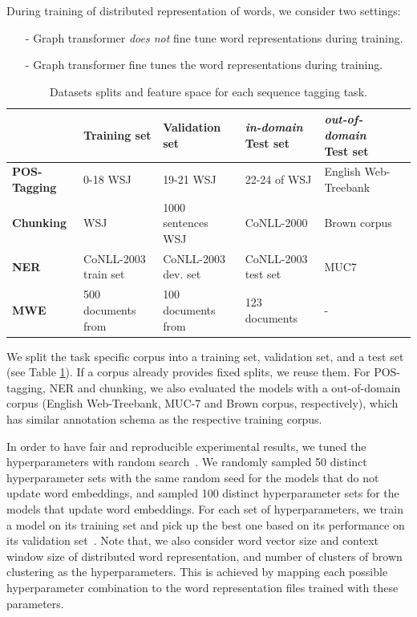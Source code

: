 During training of distributed representation of words, we consider two settings: 

\begin{small}
\begin{itemize}
\item[-] Graph transformer \textit{does not} fine tune word representations during training. 
\item[-] Graph transformer fine tunes the word representations during training. 
\end{itemize}
\end{small}

\begin{table}
\caption{Datasets splits and feature space for each sequence tagging task.}
\begin{small}
\begin{tabular}{lllp{}ll}
\hline
			& \textbf{Training set} & \textbf{Validation set} & \textbf{\textit{in-domain} Test set} & \textbf{\textit{out-of-domain} Test set} \\ \hline
\textbf{POS-Tagging} & 0-18 WSJ & 19-21 WSJ & 22-24 of WSJ & English Web-Treebank  \\
\textbf{Chunking} & WSJ & 1000 sentences WSJ & CoNLL-2000 & Brown corpus \\
\textbf{NER} & CoNLL-2003 train set & CoNLL-2003 dev. set & CoNLL-2003 test set & MUC7  \\
\textbf{MWE} & 500 documents from & 100 documents from & 123 documents & - \\
\hline
\end{tabular}
\label{datasplit}
\end{small}
\end{table}

We split the task specific corpus into a training set, validation set, and a test set (see Table \ref{datasplit}). If a corpus already provides fixed splits, we reuse them. For POS-tagging,  NER and chunking, we also evaluated the models with a out-of-domain corpus (English Web-Treebank, MUC-7 and Brown corpus, respectively), which has similar annotation schema as the respective training corpus.

In order to have fair and reproducible experimental results, we tuned the hyperparameters with random search~\cite{bergstra2012random}. 
We randomly sampled 50 distinct hyperparameter sets with the same random seed for the models that do not update word embeddings, and sampled 100 distinct hyperparameter sets for the models that update word embeddings. 
For each set of hyperparameters, we train a model on its training set and pick up the best one based on its performance on its validation set~\cite{turian2010word}. 
Note that, we also consider word vector size and context window size of distributed word representation, and number of clusters of brown clustering as the hyperparameters.
This is achieved by mapping each possible hyperparameter combination to the word representation files trained with these parameters. 

